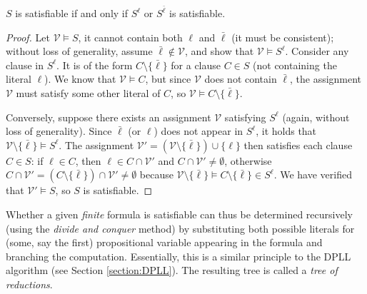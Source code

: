 \begin{lemma}\label{lemma:tree-of-reductions}
$S$ is satisfiable if and only if $S^\ell$ or $S^{\bar{\ell}}$ is satisfiable.    
\end{lemma}
\begin{proof}
Let $\mathcal{V} \models S$, it cannot contain both $\ell$ and $\bar{\ell}$ (it must be consistent); without loss of generality, assume $\bar{\ell} \notin \mathcal{V}$, and show that $\mathcal{V} \models S^\ell$. Consider any clause in $S^\ell$. It is of the form $C \setminus \{\bar{\ell}\}$ for a clause $C \in S$ (not containing the literal $\ell$). We know that $\mathcal{V} \models C$, but since $\mathcal{V}$ does not contain $\bar{\ell}$, the assignment $\mathcal{V}$ must satisfy some other literal of $C$, so $\mathcal{V} \models C \setminus \{\bar{\ell}\}$.

Conversely, suppose there exists an assignment $\mathcal{V}$ satisfying $S^\ell$ (again, without loss of generality). Since $\bar{\ell}$ (or $\ell$) does not appear in $S^\ell$, it holds that $\mathcal{V} \setminus \{\bar{\ell}\} \models S^\ell$. The assignment $\mathcal{V}' = (\mathcal{V} \setminus \{\bar{\ell}\}) \cup \{\ell\}$ then satisfies each clause $C \in S$: if $\ell \in C$, then $\ell \in C \cap \mathcal{V}'$ and $C \cap \mathcal{V}' \neq \emptyset$, otherwise $C \cap \mathcal{V}' = (C \setminus \{\bar{\ell}\}) \cap \mathcal{V}' \neq \emptyset$ because $\mathcal{V} \setminus \{\bar{\ell}\} \models C \setminus \{\bar{\ell}\} \in S^\ell$. We have verified that $\mathcal{V}' \models S$, so $S$ is satisfiable.
\end{proof}

Whether a given \emph{finite} formula is satisfiable can thus be determined recursively (using the \emph{divide and conquer} method) by substituting both possible literals for (some, say the first) propositional variable appearing in the formula and branching the computation. Essentially, this is a similar principle to the DPLL algorithm (see Section \ref{section:DPLL}). The resulting tree is called a \emph{tree of reductions}. 

